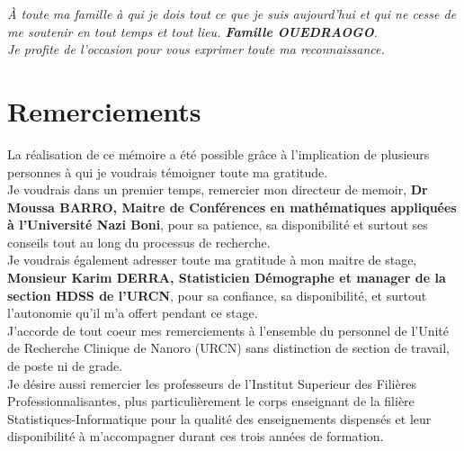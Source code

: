 \documentclass[12pt,a4paper]{report}
\begin{document}
	\begin{center}
			\textit{À toute ma famille à qui je dois tout ce que je suis aujourd'hui et qui ne cesse de me soutenir en tout temps et tout lieu. \textbf{Famille OUEDRAOGO}.\\
			Je profite de l’occasion pour vous exprimer toute ma reconnaissance.}
	\end{center}	
		
		
	
	\vspace{1.5cm}
	
	\newpage
	
	\chapter*{Remerciements}       %
	
	\vspace*{2cm}
	
	
	La réalisation de ce mémoire a été possible grâce à l'implication de plusieurs personnes à qui
	je voudrais témoigner toute ma gratitude.\\
	
	
	Je voudrais dans un premier temps, remercier mon directeur de memoir, \textbf{Dr Moussa BARRO, Maitre de Conférences en mathématiques appliquées
	à l’Université Nazi Boni}, pour sa patience, sa disponibilité et surtout ses conseils  tout au long du processus de recherche.\\
	
	
	Je voudrais également adresser toute ma gratitude à mon maitre de stage, \textbf{Monsieur Karim DERRA, Statisticien Démographe et manager de la section HDSS de l'URCN}, pour sa confiance, sa disponibilité, et surtout l’autonomie qu’il m’a offert pendant ce stage.\\
	
	
	J'accorde de tout  coeur mes remerciements à l'ensemble du personnel de  l'Unité de Recherche Clinique de Nanoro (URCN) sans distinction de section de travail, de poste ni de grade. \\
	
	
	Je désire aussi remercier les professeurs de l'Institut Superieur des Filières Professionnalisantes, plus particulièrement le corps enseignant de la filière Statistiques-Informatique pour la qualité des enseignements dispensés et leur disponibilité à m'accompagner durant ces trois années de formation.
	
\end{document}

